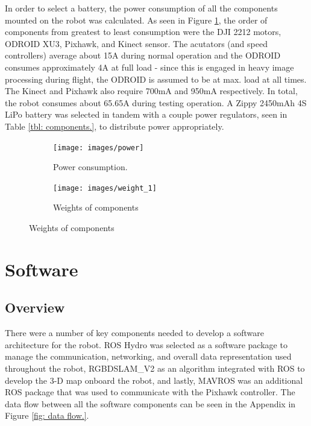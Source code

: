 \documentclass[letterpaper, oneside, 10pt]{report}
\begin{document}
In order to select a battery, the power consumption of all the components mounted on the robot was calculated. As seen in Figure \ref{fig: power.}, the order of components from greatest to least consumption were the DJI 2212 motors, ODROID XU3, Pixhawk, and Kinect sensor. The acutators (and speed controllers) average about 15A during normal operation and the ODROID consumes approximately 4A at full load - since this is engaged in heavy image processing during flight, the ODROID is assumed to be at max. load at all times. The Kinect and Pixhawk also require 700mA and 950mA respectively. In total, the robot consumes about 65.65A during testing operation. A Zippy 2450mAh 4S LiPo battery was selected in tandem with a couple power regulators, seen in Table \ref{tbl: components.}, to distribute power appropriately. \\

\begin{figure}[h]
    \centering
    \begin{subfigure}[h]{0.4\textwidth}
        \centering
        \texttt{[image: images/power]}
        \caption{Power consumption.}
        \label{fig: power.}
    \end{subfigure}
    \hfill
    \begin{subfigure}[h]{0.4\textwidth}
        \centering
        \texttt{[image: images/weight\_1]}
        \caption{Weights of components}
        \label{fig: weight.}
    \end{subfigure}
\end{figure}

\section{Software}

\subsection{Overview}
There were a number of key components needed to develop a software architecture for the robot. ROS Hydro was selected as a software package to manage the communication, networking, and overall data representation used throughout the robot, RGBDSLAM\_V2 as an algorithm integrated with ROS to develop the 3-D map onboard the robot, and lastly, MAVROS was an additional ROS package that was used to communicate with the Pixhawk controller. The data flow between all the software components can be seen in the Appendix in Figure \ref{fig: data flow.}.
\end{document}
